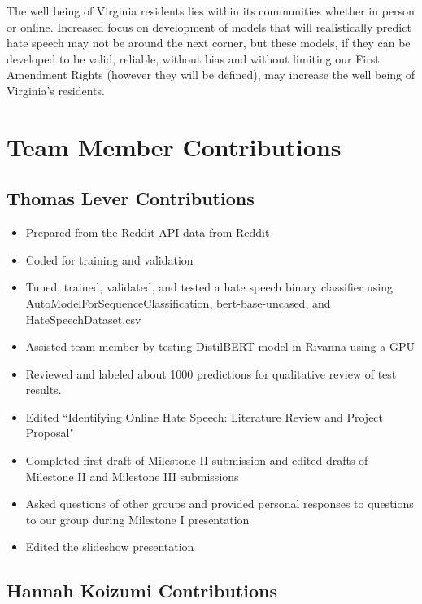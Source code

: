 \documentclass[conference]{IEEEtran}
\begin{document}
The well being of Virginia residents lies within its communities whether in person or online. Increased focus on development of models that will realistically predict hate speech may not be around the next corner, but these models, if they can be developed to be valid, reliable, without bias and without limiting our First Amendment Rights (however they will be defined), may increase the well being of Virginia's residents. 


\section{Team Member Contributions}

\subsection{Thomas Lever Contributions}

\begin{itemize}
  \item Prepared from the Reddit API data from Reddit
  \item Coded for training and validation
  \item Tuned, trained, validated, and tested a hate speech binary classifier using AutoModelForSequenceClassification, bert-base-uncased, and HateSpeechDataset.csv
  \item Assisted team member by testing DistilBERT model in Rivanna using a GPU
  \item Reviewed and labeled about 1000 predictions for qualitative review of test results.
 \item Edited “Identifying Online Hate Speech: Literature Review and Project Proposal"
 \item Completed first draft of Milestone II submission and edited drafts of Milestone II and Milestone III submissions
 \item Asked questions of other groups and provided personal responses to questions to our group during Milestone I presentation
 \item Edited the slideshow presentation
\end{itemize}

\subsection{Hannah Koizumi Contributions}
\end{document}
